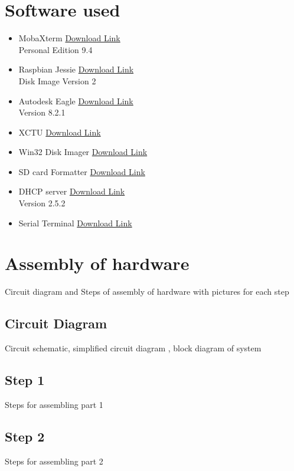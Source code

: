\documentclass[a4paper,12pt,oneside]{book}
\begin{document}
\section{Software used}
\begin{itemize}
  \item MobaXterm  
      \href{http://mobaxterm.mobatek.net/MobaXterm_Setup_9.4.msi} {Download Link}\\
      Personal Edition 9.4
      \item Raspbian Jessie   
      \href{https://downloads.raspberrypi.org/raspbian_latest}{Download Link}\\
      Disk Image Version 2
      \item Autodesk Eagle 
      \href{http://www.cadsoftusa.com/download-eagle/}{Download Link}\\
      Version 8.2.1 
      \item XCTU 
      \href{http://www.digi.com/products/xbee-rf-solutions/xctu-software/xctu#productsupport-utilities}{Download Link}
      \item Win32 Disk Imager
      \href{http://sourceforge.net/projects/win32diskimager/}{Download Link}
        \item SD card Formatter
      \href{https://www.sdcard.org/downloads/formatter_4/eula_windows/}{Download Link}
        \item DHCP server
      \href{http://www.dhcpserver.de/cms/release_notes/2-5-2/}{Download Link}\\
      Version 2.5.2
        \item Serial Terminal 
      \href{https://serial-port-terminal.en.softonic.com/}{Download Link}
\end{itemize}

\section{Assembly of hardware}
Circuit diagram and Steps of assembly of hardware with pictures for each step
\subsection*{Circuit Diagram}
Circuit schematic, simplified circuit diagram , block diagram of system
\subsection*{Step 1}
Steps for assembling part 1
\subsection*{Step 2}
Steps for assembling part 2
\end{document}
